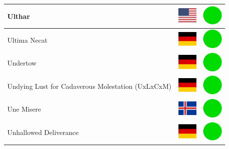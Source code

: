 \documentclass[12pt, a4paper, twoside]{report}
\begin{document}
\begin{center}
\begin{longtable}{|p{5cm}|p{2cm}|p{2cm}|}
 Ulthar                                                     & \includegraphics[width=1cm]{../4x3/us} &   \includegraphics[width=1cm]{../likes/y} \\ \hline
 Ultima Necat                                               & \includegraphics[width=1cm]{../4x3/de} &   \includegraphics[width=1cm]{../likes/y} \\ \hline
 Undertow                                                   & \includegraphics[width=1cm]{../4x3/de} &   \includegraphics[width=1cm]{../likes/y} \\ \hline
 Undying Lust for Cadaverous Molestation (UxLxCxM)          & \includegraphics[width=1cm]{../4x3/de} &   \includegraphics[width=1cm]{../likes/y} \\ \hline
 Une Misere                                                 & \includegraphics[width=1cm]{../4x3/is} &   \includegraphics[width=1cm]{../likes/y} \\ \hline
 Unhallowed Deliverance                                     & \includegraphics[width=1cm]{../4x3/de} &   \includegraphics[width=1cm]{../likes/y} \\ \hline

\end{longtable}
\end{center}
\end{document}
